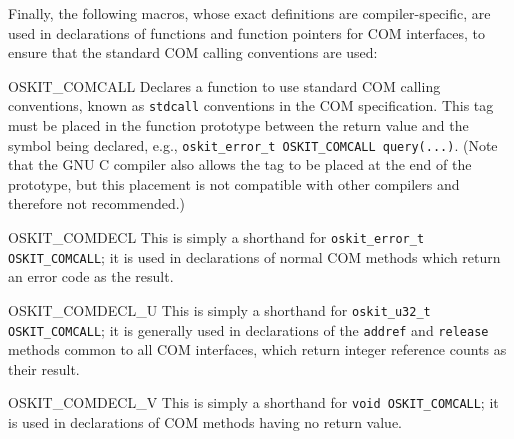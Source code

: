 \begin{apidesc}
	Finally, the following macros,
	whose exact definitions are compiler-specific,
	are used in declarations of functions and function pointers
	for COM interfaces,
	to ensure that the standard COM calling conventions are used:
	\begin{icsymlist}
	\item[OSKIT_COMCALL]
		Declares a function to use standard COM calling conventions,
		known as \texttt{stdcall} conventions in the COM specification.
		This tag must be placed in the function prototype
		between the return value and the symbol being declared,
		e.g., \texttt{oskit_error_t OSKIT_COMCALL query(...)}.
		(Note that the GNU C compiler
		also allows the tag to be placed at the end of the prototype,
		but this placement is not compatible with other compilers
		and therefore not recommended.)
	\item[OSKIT_COMDECL]
		This is simply a shorthand for
		\texttt{oskit_error_t OSKIT_COMCALL};
		it is used in declarations of normal COM methods
		which return an error code as the result.
	\item[OSKIT_COMDECL_U]
		This is simply a shorthand for
		\texttt{oskit_u32_t OSKIT_COMCALL};
		it is generally used in declarations
		of the \texttt{addref} and \texttt{release} methods
		common to all COM interfaces,
		which return integer reference counts as their result.
	\item[OSKIT_COMDECL_V]
		This is simply a shorthand for
		\texttt{void OSKIT_COMCALL};
		it is used in declarations of COM methods
		having no return value.
	\end{icsymlist}
\end{apidesc}

